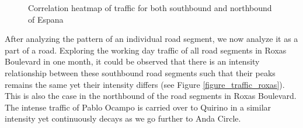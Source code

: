 \begin{figure}
    \centering
      \captionsetup{justification=centering}
    \hfill
    \caption{Correlation heatmap of traffic for both southbound and northbound of Espana}

    \label{figure_traffic_espana_corr}
\end{figure}




After analyzing the pattern of an individual road segment, we now analyze it as a part of a road. Exploring the working day traffic of all road segments in Roxas Boulevard in one month, it could be observed that there is an intensity relationship between these southbound road segments such that their peaks remains the same yet their intensity differs (see Figure \ref{figure_traffic_roxas}). This is also the case in the northbound of the road segments in Roxas Boulevard. The intense traffic of Pablo Ocampo is carried over to Quirino in a similar intensity yet continuously decays as we go further to Anda Circle.



